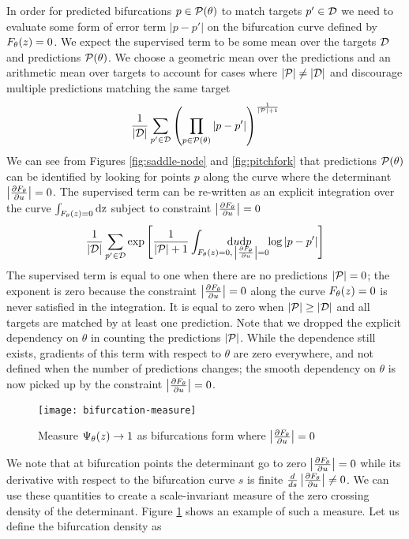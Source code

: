 In order for predicted bifurcations $p\in\mathcal{P}(\theta)$ to match targets $p'\in\mathcal{D}$ we need to evaluate some form of error term $|p-p'|$ on the bifurcation curve defined by $F_{\theta}(z)=0$. We expect the supervised term to be some mean over the targets $\mathcal{D}$ and predictions $\mathcal{P}(\theta)$. We choose a geometric mean over the predictions and an arithmetic mean over targets to account for cases where $|\mathcal{P}|\neq|\mathcal{D}|$ and discourage multiple predictions matching the same target
\begin{align}
    \frac{1}{|\mathcal{D}|}\sum_{p'\in\mathcal{D}}
    \left(\prod_{p\in\mathcal{P}(\theta)}|p-p'|\right)
    ^{\frac{1}{|\mathcal{P}|+1}}
\end{align}
We can see from Figures \ref{fig:saddle-node} and \ref{fig:pitchfork} that predictions $\mathcal{P}(\theta)$ can be identified by looking for points $p$ along the curve where the determinant $\left| \frac{\partial F_{\theta}}{\partial u} \right|=0$. The supervised term can be re-written as an explicit integration over the curve $\int_{F_{\theta}(z)=0}\mathrm{dz}$ subject to constraint $\left| \frac{\partial F_{\theta}}{\partial u} \right|=0$
\begin{align}
    \frac{1}{|\targets|}\sum_{p'\in\targets}\exp\left[
    \frac{1}{|\predictions|+1}
    \int_{\rates(z)=0,\,\Det=0}\!\!\!\!\!\!\!\!\!\!\!\!\!\!\!\!\!\!\!\!\!\!\!\!\mathrm{d}u\mathrm{d}p\quad\,\,\log|p-p'|\right]
    \label{eq:supervised-term}
\end{align}
The supervised term is equal to one when there are no predictions $|\mathcal{P}|=0$; the exponent is zero because the constraint $\left| \frac{\partial F_{\theta}}{\partial u} \right|=0$ along the curve $F_{\theta}(z)=0$ is never satisfied in the integration. It is equal to zero when $|\mathcal{P}|\geq|\mathcal{D}|$ and all targets are matched by at least one prediction. Note that we dropped the explicit dependency on $\theta$ in counting the predictions $|\mathcal{P}|$. While the dependence still exists, gradients of this term with respect to $\theta$ are zero everywhere, and not defined when the number of predictions changes; the smooth dependency on $\theta$ is now picked up by the constraint $\left| \frac{\partial F_{\theta}}{\partial u} \right|=0$.
\begin{figure}
    \centering
    \texttt{[image: bifurcation-measure]}
    \caption{Measure $\Psi_{\theta}(z)\rightarrow 1$ as bifurcations form where $\left| \frac{\partial F_{\theta}}{\partial u} \right|=0$}
    \label{fig:bifurcation-measure}
\end{figure}
We note that at bifurcation points the determinant go to zero $\left| \frac{\partial F_{\theta}}{\partial u} \right|=0$ while its derivative with respect to the bifurcation curve $s$ is finite $\frac{d}{ds}\left| \frac{\partial F_{\theta}}{\partial u} \right|\neq 0$. We can use these quantities to create a scale-invariant measure of the zero crossing density of the determinant. Figure \ref{fig:bifurcation-measure} shows an example of such a measure. Let us define the bifurcation density as
